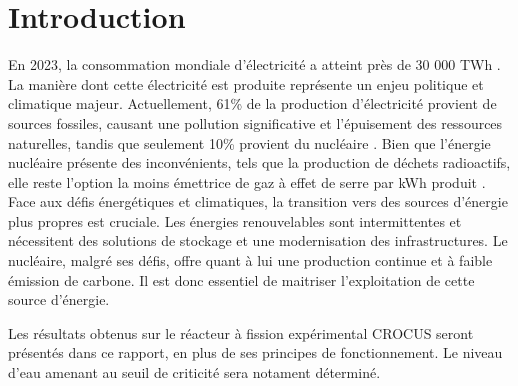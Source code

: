 \section{Introduction}

En 2023, la consommation mondiale d'électricité a atteint près de 30 000 TWh \cite{owid-energy}. La manière dont cette électricité est produite représente un enjeu politique et climatique majeur. Actuellement, 61\% de la production d'électricité provient de sources fossiles, causant une pollution significative et l'épuisement des ressources naturelles, tandis que seulement 10\% provient du nucléaire \cite{owid-electricity-mix}. Bien que l'énergie nucléaire présente des inconvénients, tels que la production de déchets radioactifs, elle reste l'option la moins émettrice de gaz à effet de serre par kWh produit \cite{owid-nuclear-energy}.
Face aux défis énergétiques et climatiques, la transition vers des sources d'énergie plus propres est cruciale. Les énergies renouvelables sont intermittentes et nécessitent des solutions de stockage et une modernisation des infrastructures. Le nucléaire, malgré ses défis, offre quant à lui une production continue et à faible émission de carbone. Il est donc essentiel de maitriser l'exploitation de cette source d'énergie.

Les résultats obtenus sur le réacteur à fission expérimental CROCUS seront présentés dans ce rapport, en plus de ses principes de fonctionnement. Le niveau d'eau amenant au seuil de criticité sera notament déterminé.